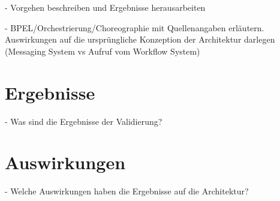   - Vorgehen beschreiben und Ergebnisse herausarbeiten

  - BPEL/Orchestrierung/Choreographie mit Quellenangaben erläutern. Auswirkungen auf die ursprüngliche Konzeption der Architektur darlegen (Messaging System vs Aufruf vom Workflow System)


\section{Ergebnisse} %
\label{sec:ergebnisse}

  - Was sind die Ergebnisse der Validierung?


\section{Auswirkungen} %
\label{sec:auswirkungen}

  - Welche Auswirkungen haben die Ergebnisse auf die Architektur?


